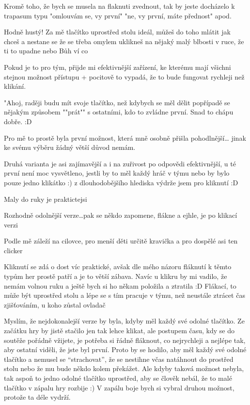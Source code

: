 \begtt
Kromě toho, že bych se musela na flaknuti zvednout, tak by
jeste docházelo k trapasum typu "omlouvám se, vy první"
"ne, vy první, máte přednost" apod. 
\endtt

\begtt
Hodně hustý! Za mě tlačítko uprostřed stolu ideál,
můžeš do toho mlátit jak chceš a nestane se že se třeba omylem
uklikneš na nějaký malý blbosti v ruce, že ti to
upadne nebo Bůh ví co
\endtt

\begtt
Pokud je to pro tým, přijde mi efektivnější zařízení,
ke kterému mají všichni stejnou možnost přístupu + pocitově
to vypadá, že to bude fungovat rychleji než klikání.
\endtt

\begtt
"Ahoj, raději budu mít svoje tlačítko, než kdybych se měl
dělit popřípadě se nějakým způsobem ""prát"" s ostatními,
kdo to zvládne první. Snad to chápu dobře. :D 
\endtt

\begtt
Pro mě to prostě byla první možnost, která mně osobně přišla
pohodlnější… jinak ke svému výběru žádný větší důvod nemám.
\endtt

\begtt
Druhá varianta je asi zajímavější a i na zuřivost po
odpovědi efektivnější, u té první není moc vysvětleno,
jestli by to měl každý hráč v týmu nebo by bylo pouze
jedno klikátko :) z dlouhodobějšího hlediska výdrže
jsem pro kliknutí :D
\endtt

\begtt
Maly do ruky je praktictejsi
\endtt

\begtt
Rozhodně odolnější verze…pak se někdo zapomene,
flákne a ejhle, je po klikací verzi
\endtt

\begtt
Podle mě záleží na cilovce, pro menší děti určitě kravička
a pro dospělé asi ten clicker
\endtt

\begtt
Kliknutí se zdá o dost víc praktické, avšak dle mého názoru
fláknutí k těmto typům her prostě patří a je to větší zábava.
Navíc u klikru by mi vadilo, že nemám volnou ruku a ještě bych
si ho někam položila a ztratila :D
Flákací, to může být uprostřed stolu a lépe se s tím pracuje
v týmu, než neustále ztrácet čas zjišťováním, u koho zůstal ovladač 
\endtt

\begtt
Myslím, že nejdokonalejší verze by byla, kdyby měl každý své
odolné tlačítko. Ze začátku hry by jistě stačilo jen tak lehce klikat,
ale postupem času, kdy se do soutěže pořádně vžijete, je potřeba
si řádně fláknout, co nejrychleji a nejlépe tak, aby ostatní viděli,
že jste byl první. Proto by se hodilo, aby měl každý své odolné
tlačítko a nemusel se “strachovat”, že se nestihne včas
natáhnout do prostřed stolu nebo že mu bude někdo kolem překážet.
Ale kdyby taková možnost nebyla, tak aspoň to jedno odolné tlačítko
uprostřed, aby se člověk nebál, že to malé tlačítko v zápalu hry
rozbije :) V zapálu boje bych si vybral druhou možnost,
protože ta déle vydrží.
\endtt

